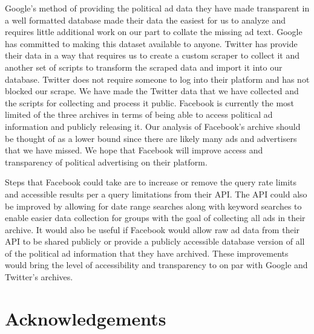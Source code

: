 \documentclass[fleqn,10pt]{wlscirep}
\begin{document}
Google's method of providing the political ad data they have made transparent in a well formatted database made their data the easiest for us to analyze and requires little additional work on our part to collate the missing ad text. Google has committed to making this dataset available to anyone. Twitter has provide their data in a way that requires us to create a custom scraper to collect it and another set of scripts to transform the scraped data and import it into our database. Twitter does not require someone to log into their platform and has not blocked our scrape. We have made the Twitter data that we have collected and the scripts for collecting and process it public. Facebook is currently the most limited of the three archives in terms of being able to access political ad information and publicly releasing it. Our analysis of Facebook's archive should be thought of as a lower bound since there are likely many ads and advertisers that we have missed. We hope that Facebook will improve access and transparency of political advertising on their platform.

Steps that Facebook could take are to increase or remove the query rate limits and accessible results per a query limitations from their API. The API could also be improved by allowing for date range searches along with keyword searches to enable easier data collection for groups with the goal of collecting all ads in their archive. It would also be useful if Facebook would allow raw ad data from their API to be shared publicly or provide a publicly accessible database version of all of the political ad information that they have archived. These improvements would bring the level of accessibility and transparency to on par with Google and Twitter's archives.



\section*{Acknowledgements}
\end{document}
